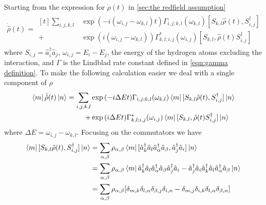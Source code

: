 Starting from the
expression for \(\dot{\rho}(t)\)
in \cref{sec:the redfield assumption}
\begin{align}
    \dot{\hat{\rho}}(t) = \begin{aligned}[t]
        \sum_{i,j,k, l} &
        \exp{(-i(\omega_{i,j}-\omega_{k,l})t)}
        \Gamma_{i,j;k, l}(\omega_{k,l})
        [S_{k, l}\hat{\rho}(t),
        S^\dagger_{i,j}]                                       \\
        +               & \exp{(i(\omega_{i,j}-\omega_{k,l}))}
        \Gamma^*_{k, l; i,j}(\omega_{i,j})
        [S_{k, l},
            \hat{\rho}(t) S^\dagger_{i,j}]
    \end{aligned}
\end{align}
where \(S_{i,j}= \hat{a}^\dagger_i \hat{a}_j\),
\(\omega_{i,j} = E_i - E_j\), the energy of
the hydrogen atoms excluding the interaction, and
\(\Gamma\) is the Lindblad rate constant
defined in \cref{eqn:gamma definition}. To
make the following calculation easier we deal
with a single component of \(\rho \)
\begin{align}
    \bra{m}\dot{\hat{\rho}}(t) \ket{n} = \begin{aligned}[t]
        \sum_{i,j,k, l} &
        \exp{(-i\Delta{}Et)}
        \Gamma_{i,j;k, l}(\omega_{k,l})
        \bra{m}[S_{k, l}\hat{\rho}(t),
        S^\dagger_{i,j}] \ket{n}               \\
        +               & \exp{(i\Delta{}E t)}
        \Gamma^*_{k, l; i,j}(\omega_{i,j})
        \bra{m}[S_{k, l},
            \hat{\rho}(t) S^\dagger_{i,j}]\ket{n}
    \end{aligned}
\end{align}
where \(\Delta{}E = \omega_{i,j}-\omega_{k,l}\).
Focusing on the commutators we have
\begin{align}
    \bra{m}[S_{k, l}\hat{\rho}(t),
    S^\dagger_{i, j}] \ket{n} & =
    \sum_{\alpha, \beta} \rho_{\alpha, \beta}\bra{m}
    [\hat{a}^\dagger_k \hat{a}_l
        \hat{a}^\dagger_\alpha \hat{a}_\beta,
        \hat{a}^\dagger_j \hat{a}_i]
    \ket{n}                       \\
                              & =
    \sum_{\alpha, \beta} \rho_{\alpha, \beta}\bra{m}
    \hat{a}^\dagger_k \hat{a}_l
    \hat{a}^\dagger_\alpha \hat{a}_\beta
    \hat{a}^\dagger_j \hat{a}_i
    -
    \hat{a}^\dagger_j \hat{a}_i
    \hat{a}^\dagger_k \hat{a}_l
    \hat{a}^\dagger_\alpha \hat{a}_\beta
    \ket{n}                       \\
                              & =
    \sum_{\alpha, \beta} \rho_{\alpha, \beta} [
        \delta_{m, k}\delta_{l, \alpha}
        \delta_{\beta, j}\delta_{i, n}
        -\delta_{m, j}\delta_{i, k}
        \delta_{l, \alpha}\delta_{\beta, n}]
\end{align}
